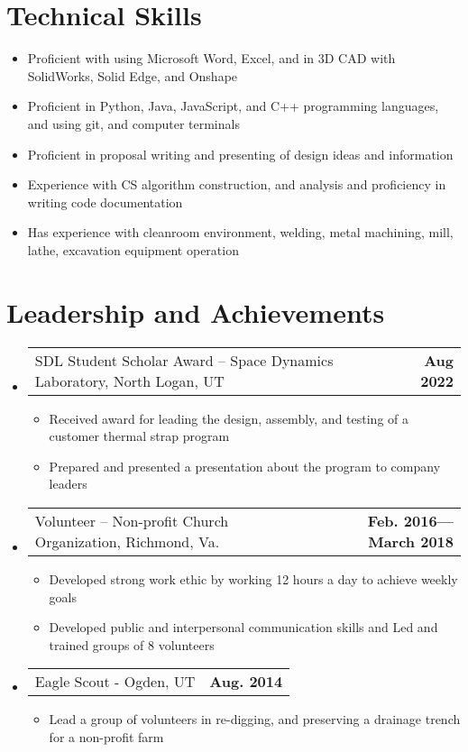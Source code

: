 \documentclass[letterpaper,11pt]{article}
\makeatletter
\newcommand{\resumeProjectHeading}[2]{
    \vspace{-6pt}
    \item
    \begin{tabular*}{1.0\textwidth}{l@{\extracolsep{\fill}}r}
      \small#1 & \textbf{\small #2}\\
    \end{tabular*}\vspace{-11pt}
}
\newcommand{\resumeSubHeadingListStart}{\begin{itemize}[leftmargin=0.0in, label={}]}
\newcommand{\resumeSubHeadingListEnd}{\end{itemize}}
\newcommand{\resumeItemListStart}{\begin{itemize}}
\newcommand{\resumeItemListEnd}{\end{itemize}\vspace{-5pt}}
\newcommand{\resumeItem}[1]{ 
  \item\small{
    {#1 \vspace{-5pt}}
  }
}
\makeatother
\begin{document}
\section{Technical Skills}
    \resumeItemListStart{}
        \resumeItem{Proficient with using Microsoft Word, Excel, and in 3D CAD with SolidWorks, Solid Edge, and Onshape} \vspace{-4.5pt}
        \resumeItem{Proficient in Python, Java, JavaScript, and C++ programming languages, and using git, and computer terminals} \vspace{-4.5pt}
        \resumeItem{Proficient in proposal writing and presenting of design ideas and information} \vspace{-4.5pt}
        \resumeItem{Experience with CS algorithm construction, and analysis and proficiency in writing code documentation} \vspace{-4.5pt}
        \resumeItem{Has experience with cleanroom environment, welding, metal machining, mill, lathe, excavation equipment operation} \vspace{-4.5pt}

    \resumeItemListEnd{}
 
\vspace{-8pt}

\section{Leadership and Achievements }
    \resumeSubHeadingListStart{}
    \resumeProjectHeading{SDL Student Scholar Award – Space Dynamics Laboratory, North Logan, UT	}{Aug 2022}
      \resumeItemListStart{}
        \resumeItem{Received award for leading the design, assembly, and testing of a customer thermal strap program}
        \resumeItem{Prepared and presented a presentation about the program to company leaders}
      \resumeItemListEnd{}
    \resumeProjectHeading{Volunteer – Non-profit Church Organization, Richmond, Va.}{Feb. 2016—March 2018}
      \resumeItemListStart{}
        \resumeItem{Developed strong work ethic by working 12 hours a day to achieve weekly goals}
        \resumeItem{Developed public and interpersonal communication skills and Led and trained groups of 8 volunteers}
      \resumeItemListEnd{}
    \resumeProjectHeading{Eagle Scout - Ogden, UT}{Aug. 2014}
      \resumeItemListStart{}
        \resumeItem{Lead a group of volunteers in re-digging, and preserving a drainage trench for a non-profit farm}
      \resumeItemListEnd{}

    \resumeSubHeadingListEnd{}
\vspace{-16pt}
\end{document}
